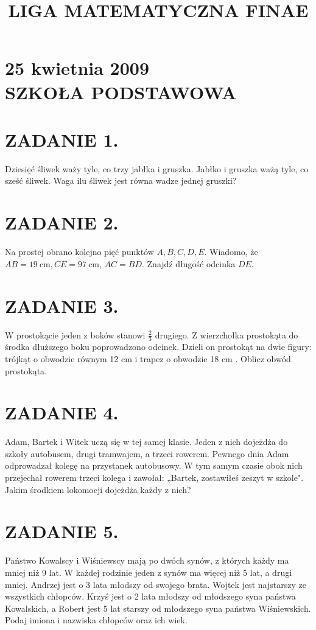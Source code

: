 \documentclass[10pt]{article}
\title{LIGA MATEMATYCZNA FINAE }
\author{}
\date{}
\begin{document}
\maketitle
\section*{25 kwietnia 2009 \\
 SZKOŁA PODSTAWOWA}
\section*{ZADANIE 1.}
Dziesięć śliwek waży tyle, co trzy jabłka i gruszka. Jabłko i gruszka ważą tyle, co sześć śliwek. Waga ilu śliwek jest równa wadze jednej gruszki?

\section*{ZADANIE 2.}
Na prostej obrano kolejno pięć punktów \(A, B, C, D, E\). Wiadomo, że \(A B=19 \mathrm{~cm}, C E=97 \mathrm{~cm}\), \(A C=B D\). Znajdź długość odcinka \(D E\).

\section*{ZADANIE 3.}
W prostokącie jeden z boków stanowi \(\frac{2}{3}\) drugiego. Z wierzchołka prostokąta do środka dłuższego boku poprowadzono odcinek. Dzieli on prostokąt na dwie figury: trójkąt o obwodzie równym 12 cm i trapez o obwodzie 18 cm . Oblicz obwód prostokąta.

\section*{ZADANIE 4.}
Adam, Bartek i Witek uczą się w tej samej klasie. Jeden z nich dojeżdża do szkoły autobusem, drugi tramwajem, a trzeci rowerem. Pewnego dnia Adam odprowadzał kolegę na przystanek autobusowy. W tym samym czasie obok nich przejechał rowerem trzeci kolega i zawołał: „Bartek, zostawiłeś zeszyt w szkole". Jakim środkiem lokomocji dojeżdża każdy z nich?

\section*{ZADANIE 5.}
Państwo Kowalscy i Wiśniewscy mają po dwóch synów, z których każdy ma mniej niż 9 lat. W każdej rodzinie jeden z synów ma więcej niż 5 lat, a drugi mniej. Andrzej jest o 3 lata młodszy od swojego brata. Wojtek jest najstarszy ze wszystkich chłopców. Krzyś jest o 2 lata młodszy od młodszego syna państwa Kowalskich, a Robert jest 5 lat starszy od młodszego syna państwa Wiśniewskich. Podaj imiona i nazwiska chłopców oraz ich wiek.
\end{document}
